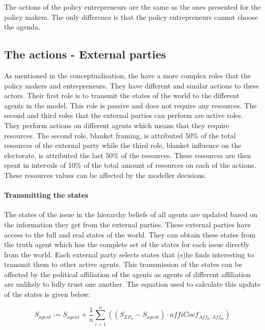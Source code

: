 The actions of the policy entrepreneurs are the same as the ones presented for the policy makers. The only difference is that the policy entrepreneurs cannot choose the agenda.

\subsection{The actions - External parties}

As mentioned in the conceptualisation, the have a more complex roles that the policy makers and entrepreneurs. They have different and similar actions to these actors. Their first role is to transmit the states of the world to the different agents in the model. This role is passive and does not require any resources. The second and third roles that the external parties can perform are active roles. They perform actions on different agents which means that they require resources. The second role, blanket framing, is attributed 50\% of the total resources of the external party while the third role, blanket influence on the electorate, is attributed the last 50\% of the resources. These resources are then spent in intervals of 10\% of the total amount of resources on each of the actions. These resources values can be affected by the modeller decisions.

\paragraph{Transmitting the states}


The states of the issue in the hierarchy beliefs of all agents are updated based on the information they get from the external parties. These external parties have access to the full and real states of the world. They can obtain these states from the truth agent which has the complete set of the states for each issue directly from the world. Each external party selects states that (s)he finds interesting to transmit them to other active agents. This transmission of the states can be affected by the political affiliation of the agents as agents of different affiliation are unlikely to fully trust one another. The equation used to calculate this update of the states is given below:

\begin{equation}
S_{agent} := S_{agent} + \frac{1}{n} \sum_{i=1}^n \left( \left(S_{EP_n} - S_{agent} \right) \cdot affiCoef_{Aff_n,Aff_m} \right)
\end{equation}

